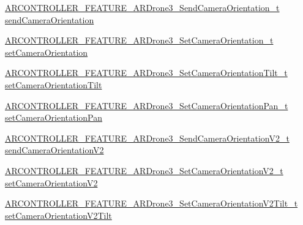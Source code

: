 \begin{DoxyCompactItemize}
\item 
\hyperlink{_a_r_c_o_n_t_r_o_l_l_e_r___feature_8h_ac93bd7ea5de776bc06c7b8b5987d1e9b}{A\+R\+C\+O\+N\+T\+R\+O\+L\+L\+E\+R\+\_\+\+F\+E\+A\+T\+U\+R\+E\+\_\+\+A\+R\+Drone3\+\_\+\+Send\+Camera\+Orientation\+\_\+t} \hyperlink{struct_a_r_c_o_n_t_r_o_l_l_e_r___f_e_a_t_u_r_e___a_r_drone3__t_a8fd89908003ee4f5699d613bfb83c4bd}{send\+Camera\+Orientation}
\item 
\hyperlink{_a_r_c_o_n_t_r_o_l_l_e_r___feature_8h_a36213dfc1bb5a2ec07f74820ad5d4b25}{A\+R\+C\+O\+N\+T\+R\+O\+L\+L\+E\+R\+\_\+\+F\+E\+A\+T\+U\+R\+E\+\_\+\+A\+R\+Drone3\+\_\+\+Set\+Camera\+Orientation\+\_\+t} \hyperlink{struct_a_r_c_o_n_t_r_o_l_l_e_r___f_e_a_t_u_r_e___a_r_drone3__t_a47b1d6f55c630ae661bb6606ac7cfb54}{set\+Camera\+Orientation}
\item 
\hyperlink{_a_r_c_o_n_t_r_o_l_l_e_r___feature_8h_a01b09f523da27315fd45c56cd3e30b24}{A\+R\+C\+O\+N\+T\+R\+O\+L\+L\+E\+R\+\_\+\+F\+E\+A\+T\+U\+R\+E\+\_\+\+A\+R\+Drone3\+\_\+\+Set\+Camera\+Orientation\+Tilt\+\_\+t} \hyperlink{struct_a_r_c_o_n_t_r_o_l_l_e_r___f_e_a_t_u_r_e___a_r_drone3__t_a584b23c009f2487bc5686a1890e59b16}{set\+Camera\+Orientation\+Tilt}
\item 
\hyperlink{_a_r_c_o_n_t_r_o_l_l_e_r___feature_8h_abeb5811c13cc31409258e5a9f9a286e8}{A\+R\+C\+O\+N\+T\+R\+O\+L\+L\+E\+R\+\_\+\+F\+E\+A\+T\+U\+R\+E\+\_\+\+A\+R\+Drone3\+\_\+\+Set\+Camera\+Orientation\+Pan\+\_\+t} \hyperlink{struct_a_r_c_o_n_t_r_o_l_l_e_r___f_e_a_t_u_r_e___a_r_drone3__t_a9d3f73244b6bda8b39ac63ba8cd13a40}{set\+Camera\+Orientation\+Pan}
\item 
\hyperlink{_a_r_c_o_n_t_r_o_l_l_e_r___feature_8h_aa89b210e3f8a2a1ac50e916a7f432676}{A\+R\+C\+O\+N\+T\+R\+O\+L\+L\+E\+R\+\_\+\+F\+E\+A\+T\+U\+R\+E\+\_\+\+A\+R\+Drone3\+\_\+\+Send\+Camera\+Orientation\+V2\+\_\+t} \hyperlink{struct_a_r_c_o_n_t_r_o_l_l_e_r___f_e_a_t_u_r_e___a_r_drone3__t_a44bb97edbb4c67a04920cf8f2a57c883}{send\+Camera\+Orientation\+V2}
\item 
\hyperlink{_a_r_c_o_n_t_r_o_l_l_e_r___feature_8h_ae44ceab5cb13be5775a3042ccf065dbc}{A\+R\+C\+O\+N\+T\+R\+O\+L\+L\+E\+R\+\_\+\+F\+E\+A\+T\+U\+R\+E\+\_\+\+A\+R\+Drone3\+\_\+\+Set\+Camera\+Orientation\+V2\+\_\+t} \hyperlink{struct_a_r_c_o_n_t_r_o_l_l_e_r___f_e_a_t_u_r_e___a_r_drone3__t_a64e0bd4fab318b026af20674407f967e}{set\+Camera\+Orientation\+V2}
\item 
\hyperlink{_a_r_c_o_n_t_r_o_l_l_e_r___feature_8h_af64bcbc76631adc7145f353429b8d71b}{A\+R\+C\+O\+N\+T\+R\+O\+L\+L\+E\+R\+\_\+\+F\+E\+A\+T\+U\+R\+E\+\_\+\+A\+R\+Drone3\+\_\+\+Set\+Camera\+Orientation\+V2\+Tilt\+\_\+t} \hyperlink{struct_a_r_c_o_n_t_r_o_l_l_e_r___f_e_a_t_u_r_e___a_r_drone3__t_a6094ece520e92095cd05da4503483063}{set\+Camera\+Orientation\+V2\+Tilt}

\end{DoxyCompactItemize}

